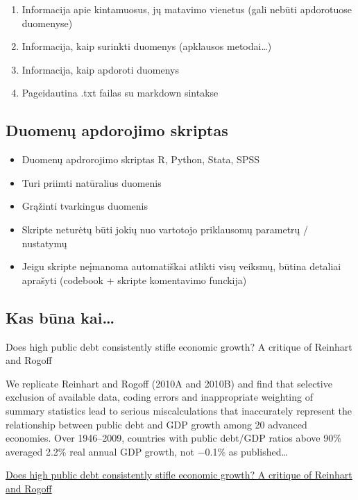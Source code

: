 \documentclass[]{article}
\providecommand{\tightlist}{%
  \setlength{\itemsep}{0pt}\setlength{\parskip}{0pt}}
\begin{document}
\begin{enumerate}
\def\labelenumi{\arabic{enumi}.}
\tightlist
\item
  Informacija apie kintamuosus, jų matavimo vienetus (gali nebūti
  apdorotuose duomenyse)
\item
  Informacija, kaip surinkti duomenys (apklausos metodai\ldots{})
\item
  Informacija, kaip apdoroti duomenys
\item
  Pageidautina .txt failas su markdown sintakse
\end{enumerate}

\subsection{Duomenų apdorojimo
skriptas}\label{duomenu-apdorojimo-skriptas}

\begin{itemize}
\tightlist
\item
  Duomenų apdrorojimo skriptas R, Python, Stata, SPSS
\item
  Turi priimti natūralius duomenis
\item
  Grąžinti tvarkingus duomenis
\item
  Skripte neturėtų būti jokių nuo vartotojo priklausomų parametrų /
  nustatymų
\item
  Jeigu skripte neįmanoma automatiškai atlikti visų veiksmų, būtina
  detaliai aprašyti (codebook + skripte komentavimo funckija)
\end{itemize}

\subsection{Kas būna kai\ldots{}}\label{kas-buna-kai}

Does high public debt consistently stifle economic growth? A critique of
Reinhart and Rogoff

We replicate Reinhart and Rogoff (2010A and 2010B) and find that
selective exclusion of available data, coding errors and inappropriate
weighting of summary statistics lead to serious miscalculations that
inaccurately represent the relationship between public debt and GDP
growth among 20 advanced economies. Over 1946--2009, countries with
public debt/GDP ratios above 90\% averaged 2.2\% real annual GDP growth,
not −0.1\% as published\ldots{}

\href{https://umassmed.edu/globalassets/quantitative-health-sciences/files/camb.-j.-econ.-2013-herndon-cje-bet075.pdf}{Does
high public debt consistently stifle economic growth? A critique of
Reinhart and Rogoff}
\end{document}
